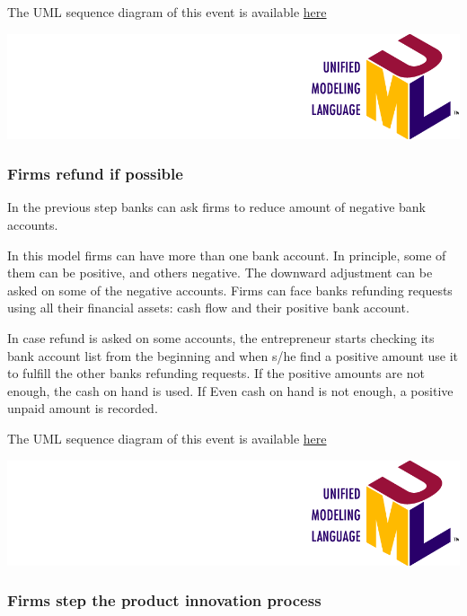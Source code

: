 \documentclass{book}
\newcommand{\doclocation}{file:///Users/giulioni/Documents/workspace/gabriele/docs}
\begin{document}
\vskip3mm

The UML sequence diagram of this event is available \href{\doclocation/umldoc/updateFirmsAccounts.html}{here}
\begin{marginfigure}
	\includegraphics[scale=0.1]{uml.png}
\end{marginfigure}


\subsubsection{Firms refund if possible}
In the previous step banks can ask firms to reduce amount of negative bank accounts. 

In this model firms can have more than one bank account. In principle, some of them can be positive, and others negative. The downward adjustment can be asked on some of the negative accounts.  Firms can face banks refunding requests using all their financial assets: cash flow and their positive bank account. 

In case refund is asked on some accounts, the entrepreneur starts checking its bank account list from the beginning and when s/he find a positive amount use it to fulfill the other banks refunding requests.
If the positive amounts are not enough, the cash on hand is used. If Even cash on hand is not enough, a positive unpaid amount is recorded.

The UML sequence diagram of this event is available \href{\doclocation/umldoc/firms_payBackBankDebt.html}{here}
\begin{marginfigure}
	\includegraphics[scale=0.1]{uml.png}
\end{marginfigure}

\subsubsection{Firms step the product innovation process}
\end{document}
